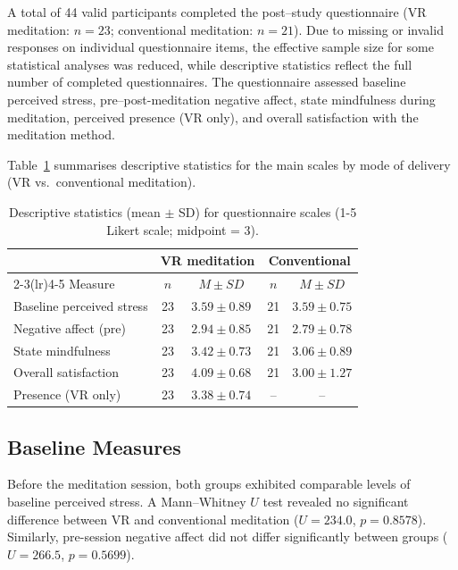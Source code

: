 A total of 44 valid participants completed the post–study questionnaire
(VR meditation: $n = 23$; conventional meditation: $n = 21$). Due to missing or invalid responses on individual questionnaire items,
the effective sample size for some statistical analyses was reduced,
while descriptive statistics reflect the full number of completed
questionnaires.
The questionnaire assessed baseline perceived stress, pre–post-meditation negative affect, state mindfulness during meditation, perceived presence (VR only), and overall satisfaction with the meditation method.

Table~\ref{tab:questionnaire_descriptives} summarises descriptive
statistics for the main scales by mode of delivery (VR vs.\ conventional
meditation).


\begin{table}[t]
  \centering
  \caption{Descriptive statistics (mean $\pm$ SD) for questionnaire scales (1-5 Likert scale; midpoint = 3).}

  \label{tab:questionnaire_descriptives}
  \begin{tabular}{lcccc}
  \toprule
   & \multicolumn{2}{c}{VR meditation} & \multicolumn{2}{c}{Conventional} \\
  \cmidrule(lr){2-3}\cmidrule(lr){4-5}
  Measure & $n$ & $M \pm SD$ & $n$ & $M \pm SD$ \\
  \midrule
  Baseline perceived stress       & 23 & $3.59 \pm 0.89$ & 21 & $3.59 \pm 0.75$ \\
  Negative affect (pre)           & 23 & $2.94 \pm 0.85$ & 21 & $2.79 \pm 0.78$ \\
  State mindfulness               & 23 & $3.42 \pm 0.73$ & 21 & $3.06 \pm 0.89$ \\
  Overall satisfaction            & 23 & $4.09 \pm 0.68$ & 21 & $3.00 \pm 1.27$ \\
  Presence (VR only)              & 23 & $3.38 \pm 0.74$ & -- & -- \\
  \bottomrule
\end{tabular}

\end{table}


\subsection{Baseline Measures}

Before the meditation session, both groups exhibited comparable levels
of baseline perceived stress. A Mann--Whitney $U$ test revealed no
significant difference between VR and conventional meditation
($U = 234.0$, $p = 0.8578$). Similarly, pre-session negative affect did
not differ significantly between groups
($U = 266.5$, $p = 0.5699$).


